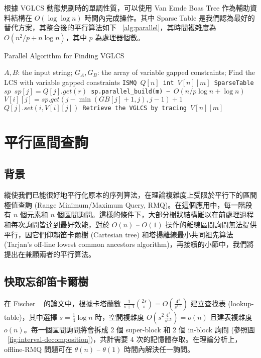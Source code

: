 \documentclass{gapd}
\begin{document}
根據 VGLCS 動態規劃時的單調性質，可以使用 Van Emde Boas Tree 作為輔助資料結構在 $O(\log \log n)$ 時間內完成操作。其中 Sparse Table 是我們認為最好的替代方案，其整合後的平行算法如下 ~\ref{alg:parallel}，其時間複雜度為 $O(n^2 / p + n \log n)$，其中 $p$ 為處理器個數。

\begin{algorithm*}
  \caption{Parallel Algorithm for Finding VGLCS}
  \label{alg:parallel}
  \begin{algorithmic}[1]
    \Require
      $A, B$: the input string;
      $G_A, G_B$: the array of variable gapped constraints;
    \Ensure Find the LCS with variable gapped constraints
    \State \tt{ISMQ} $Q[n]$
    \State \tt{int} $V[n][m]$
      \State SparseTable $sp$
        \State $sp[j] = Q[j].get(r)$
      \EndParFor
      \State sp.parallel\_build(m) -- $O(n/p \log n + \log n)$
            \State $V[i][j] = sp.get(j - \min(GB[j]+1, j), j-1)+1$
            \State $Q[j].set(i, V[i][j])$
        \EndIf
      \EndParFor
    \EndFor
    \State Retrieve the VGLCS by tracing $V[n][m]$
  \end{algorithmic}
\end{algorithm*}

\section{平行區間查詢} %
\label{sec:parallelRMQ}

\subsection{背景}

縱使我們已能很好地平行化原本的序列算法，在理論複雜度上受限於平行下的區間極值查詢 (Range Minimum/Maximum Query, RMQ)。在這個應用中，每一階段有 $n$ 個元素和 $n$ 個區間詢問。這樣的條件下，大部分樹狀結構難以在前處理過程和每次詢問皆達到最好效能，對於 $O(n)$ -- $O(1)$ 操作的離線區間詢問無法提供平行，因它們仰賴笛卡爾樹 (Cartesian tree) 和塔揚離線最小共同祖先算法 (Tarjan's off-line lowest common ancestors algorithm)，再接續的小節中，我們將提出在兼顧兩者的平行算法。

\subsection{快取忘卻笛卡爾樹}

在 Fischer ~\cite{fischer} 的論文中，根據卡塔蘭數 $\frac{1}{s+1}\binom{2s}{s} = O(\frac{4^s}{s^{1.5}})$ 建立查找表 (lookup-table)，其中選擇 $s = \frac{1}{4} \log n$ 時，空間複雜度 $O(s^2 \frac{4^s}{s^{1.5}}) = o(n)$ 且建表複雜度 $o(n)$。每一個區間詢問將會拆成 2 個 super-block 和 2 個 in-block 詢問 (參照圖 ~\ref{fig:interval-decomposition})，共計需要 4 次的記憶體存取。在理論分析上，offline-RMQ 問題可在 $\theta(n)$ -- $\theta(1)$ 時間內解決任一詢問。
\end{document}
